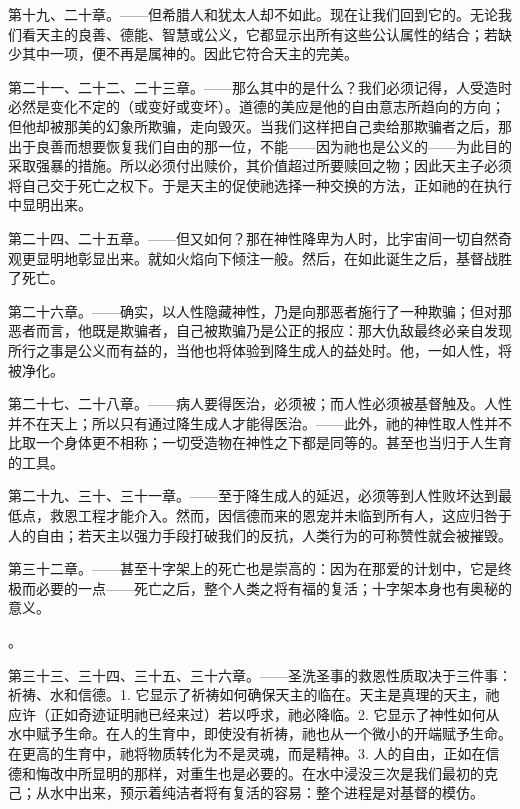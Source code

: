 第十九、二十章。——但希腊人和犹太人却不如此。现在让我们回到它的。无论我们看天主的良善、德能、智慧或公义，它都显示出所有这些公认属性的结合；若缺少其中一项，便不再是属神的。因此它符合天主的完美。\par

第二十一、二十二、二十三章。——那么其中的是什么？我们必须记得，人受造时必然是变化不定的（或变好或变坏）。道德的美应是他的自由意志所趋向的方向；但他却被那美的幻象所欺骗，走向毁灭。当我们这样把自己卖给那欺骗者之后，那出于良善而想要恢复我们自由的那一位，不能——因为祂也是公义的——为此目的采取强暴的措施。所以必须付出赎价，其价值超过所要赎回之物；因此天主子必须将自己交于死亡之权下。于是天主的促使祂选择一种交换的方法，正如祂的在执行中显明出来。\par

第二十四、二十五章。——但又如何？那在神性降卑为人时，比宇宙间一切自然奇观更显明地彰显出来。就如火焰向下倾注一般。然后，在如此诞生之后，基督战胜了死亡。\par

第二十六章。——确实，以人性隐藏神性，乃是向那恶者施行了一种欺骗；但对那恶者而言，他既是欺骗者，自己被欺骗乃是公正的报应：那大仇敌最终必亲自发现所行之事是公义而有益的，当他也将体验到降生成人的益处时。他，一如人性，将被净化。\par

第二十七、二十八章。——病人要得医治，必须被；而人性必须被基督触及。人性并不在天上；所以只有通过降生成人才能得医治。——此外，祂的神性取人性并不比取一个身体更不相称；一切受造物在神性之下都是同等的。甚至也当归于人生育的工具。\par

第二十九、三十、三十一章。——至于降生成人的延迟，必须等到人性败坏达到最低点，救恩工程才能介入。然而，因信德而来的恩宠并未临到所有人，这应归咎于人的自由；若天主以强力手段打破我们的反抗，人类行为的可称赞性就会被摧毁。\par

第三十二章。——甚至十字架上的死亡也是崇高的：因为在那爱的计划中，它是终极而必要的一点——死亡之后，整个人类之将有福的复活；十字架本身也有奥秘的意义。\par

。\par

第三十三、三十四、三十五、三十六章。——圣洗圣事的救恩性质取决于三件事：祈祷、水和信德。1. 它显示了祈祷如何确保天主的临在。天主是真理的天主，祂应许（正如奇迹证明祂已经来过）若以呼求，祂必降临。2. 它显示了神性如何从水中赋予生命。在人的生育中，即使没有祈祷，祂也从一个微小的开端赋予生命。在更高的生育中，祂将物质转化为不是灵魂，而是精神。3. 人的自由，正如在信德和悔改中所显明的那样，对重生也是必要的。在水中浸没三次是我们最初的克己；从水中出来，预示着纯洁者将有复活的容易：整个进程是对基督的模仿。\par

